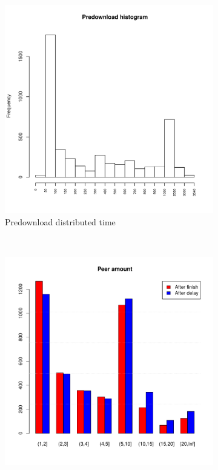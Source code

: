 \begin{figure}[h!]
	\begin{adjustwidth}{-2cm}{}
	\begin{subfigure}[t]{0.6\textwidth}
		\centering
		\includegraphics[width=\textwidth]{pics/results/hpredown_t60i30.pdf}
		\caption{Predownload distributed time}
		\label{fig:predownhist}
	\end{subfigure}
	~
	\begin{subfigure}[t]{0.6\textwidth}
		\centering
		\includegraphics[width=\textwidth]{pics/results/ppredown_t60i30.pdf}

\end{subfigure}
\end{adjustwidth}
\end{figure}
